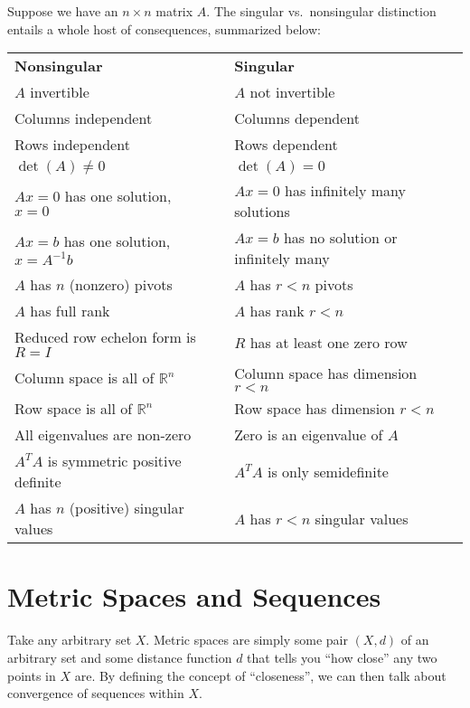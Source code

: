 \documentclass[12pt]{article}
\theoremstyle{plain}
\theoremstyle{definition}
\theoremstyle{remark}
\begin{document}
Suppose we have an $n\times n$ matrix $A$. The singular vs.\ nonsingular
distinction entails a whole host of consequences, summarized below:
\begin{table}[h!]
\centering
\begin{tabular}{lll}
\textbf{Nonsingular}                     && \textbf{Singular} \\
$A$ invertible                           && $A$ not invertible \\
Columns independent                      && Columns dependent \\
Rows independent                         && Rows dependent \\
$\det(A)\neq0$                           && $\det(A)=0$ \\
$Ax = 0$ has one solution, $x = 0$       && $Ax=0$ has infinitely many solutions\\
$Ax = b$ has one solution, $x = A^{-1}b$ && $Ax = b$ has no solution or infinitely many \\
$A$ has $n$ (nonzero) pivots             && $A$ has $r<n$ pivots \\
$A$ has full rank                        && $A$ has rank $r<n$ \\
Reduced row echelon form is $R = I$      && $R$ has at least one zero row \\
Column space is all of $\mathbb{R}^n$    && Column space has dimension $r<n$ \\
Row space is all of $\mathbb{R}^n$       && Row space has dimension $r<n$ \\
All eigenvalues are non-zero             && Zero is an eigenvalue of $A$ \\
$A^T A$ is symmetric positive definite   && $A^T A$ is only semidefinite \\
$A$ has $n$ (positive) singular values   && $A$ has $r<n$ singular values
\end{tabular}
\end{table}


\section{Metric Spaces and Sequences}

Take any arbitrary set $X$. Metric spaces are simply some pair $(X,d)$
of an arbitrary set and some distance function $d$ that tells you ``how
close'' any two points in $X$ are. By defining the concept of
``closeness'', we can then talk about convergence of sequences within
$X$.
\end{document}
